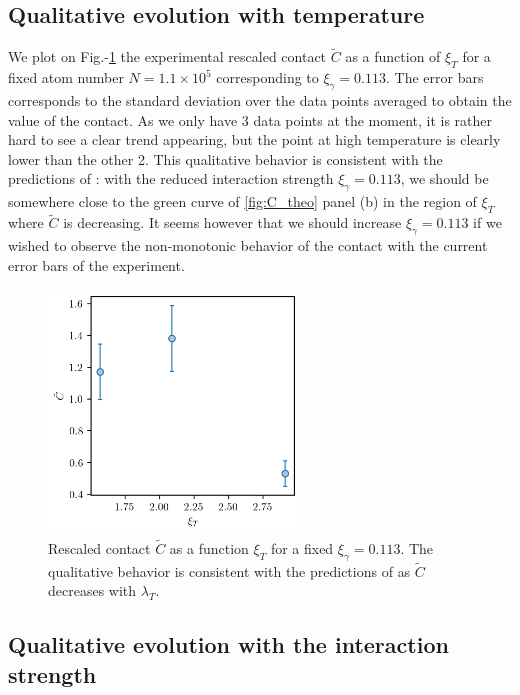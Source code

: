 \subsection{Qualitative evolution with temperature}

We plot on Fig.-\ref{fig:C_tilde_vs_T} the experimental rescaled contact $\tilde{C}$ as a function of $\xi_T$ for a fixed atom number $N=1.1 \times 10^5$ corresponding to $\xi_{\gamma}=0.113$. The error bars corresponds to the standard deviation over the data points averaged to obtain the value of the contact. As we only have 3 data points at the moment, it is rather hard to see a clear trend appearing, but the point at high temperature is clearly lower than the other 2. This qualitative behavior is consistent with the predictions of \cite{yao2018tan}: with the reduced interaction strength $\xi_{\gamma}=0.113$, we should be somewhere close to the green curve of \ref{fig:C_theo} panel (b) in the region of $\xi_T$ where $\tilde{C}$ is decreasing. It seems however that we should increase $\xi_{\gamma}=0.113$ if we wished to observe the non-monotonic behavior of the contact with the current error bars of the experiment.

\begin{figure}
    \centering
    \includegraphics[width=0.6\textwidth]{Fig/Chapter5/C_tilde_vs_T.png}
    \caption{Rescaled contact $\tilde{C}$ as a function $\xi_T$ for a fixed $\xi_{\gamma}=0.113$. The qualitative behavior is consistent with the predictions of \cite{yao2018tan} as $\tilde{C}$ decreases with $\lambda_T$. }
    \label{fig:C_tilde_vs_T}
\end{figure}

\subsection{Qualitative evolution with the interaction strength}

